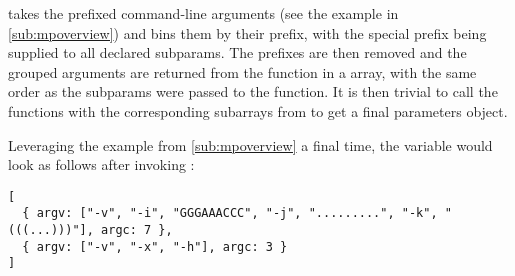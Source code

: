 \documentclass[11pt]{article}
\begin{document}
 takes the prefixed command-line arguments (see the example in \ref{sub:mpoverview}) and bins them by their prefix, with the special  prefix being supplied to all declared subparams. The prefixes are then removed and the grouped arguments are returned from the function in a  array, with the same order as the subparams were passed to the function. It is then trivial to call the  functions with the corresponding subarrays from  to get a final parameters object.

Leveraging the example from \ref{sub:mpoverview} a final time, the variable  would look as follows after invoking :

\begin{verbatim}
[
  { argv: ["-v", "-i", "GGGAAACCC", "-j", ".........", "-k", "(((...)))"], argc: 7 },
  { argv: ["-v", "-x", "-h"], argc: 3 }
]
\end{verbatim}









\end{document}
